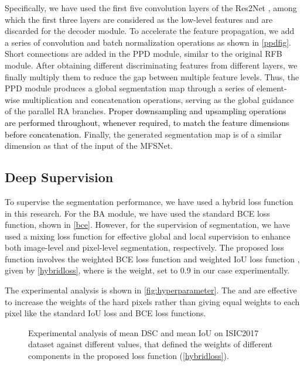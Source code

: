 \documentclass[review]{elsarticle}
\begin{document}
Specifically, we have used the first five convolution layers of the Res2Net \cite{gao2019res2net}, among which the first three layers are considered as the low-level features and are discarded for the decoder module. To accelerate the feature propagation, we add a series of convolution and batch normalization operations as shown in \autoref{ppdfig}. Short connections are added in the PPD module, similar to the original RFB module. After obtaining different discriminating features from different layers, we finally multiply them to reduce the gap between multiple feature levels. Thus, the PPD module produces a global segmentation map  through a series of element-wise multiplication and concatenation operations, serving as the global guidance of the parallel RA branches. \textcolor{black}{Proper downsampling and upsampling operations are performed throughout, whenever required, to match the feature dimensions before concatenation.} Finally, the generated segmentation map is of a similar dimension as that of the input of the MFSNet.

\subsection{Deep Supervision}\label{loss}
To supervise the segmentation performance, we have used a hybrid loss function in this research. For the BA module, we have used the standard BCE loss function, shown in \autoref{bce}. However, for the supervision of segmentation, we have used a mixing loss function for effective global and local supervision to enhance both image-level and pixel-level segmentation, respectively. The proposed loss function involves the weighted BCE loss function  and weighted IoU loss function , given by \autoref{hybridloss}, where  is the weight, set to 0.9 in our case experimentally.



The experimental analysis is shown in \autoref{fig:hyperparameter}. The  and  are effective to increase the weights of the hard pixels rather than giving equal weights to each pixel like the standard IoU loss and BCE loss functions. 

\begin{figure}
    \centering
    \caption{Experimental analysis of mean DSC and mean IoU on ISIC2017 dataset against different  values, that defined the weights of different components in the proposed loss function (\autoref{hybridloss}).}
    \label{fig:hyperparameter}
\end{figure}
\end{document}
